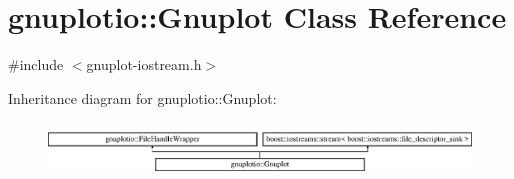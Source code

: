 \hypertarget{classgnuplotio_1_1_gnuplot}{}\section{gnuplotio\+:\+:Gnuplot Class Reference}
\label{classgnuplotio_1_1_gnuplot}


{\ttfamily \#include $<$gnuplot-\/iostream.\+h$>$}

Inheritance diagram for gnuplotio\+:\+:Gnuplot\+:\begin{figure}[H]
\begin{center}
\leavevmode
\includegraphics[height=1.469816cm]{classgnuplotio_1_1_gnuplot}
\end{center}
\end{figure}
